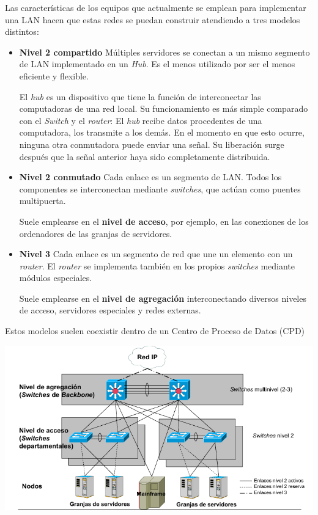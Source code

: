 Las características de los equipos que actualmente se emplean para implementar una LAN hacen que estas redes se puedan construir atendiendo a tres modelos distintos:
\begin{itemize}
\item \textbf{Nivel 2 compartido} Múltiples servidores se conectan a un mismo segmento de LAN implementado en un \textit{Hub}. Es el menos utilizado por ser el menos eficiente y flexible.

El \textit{hub} es un dispositivo que tiene la función de interconectar las computadoras de una red local. Su funcionamiento es más simple comparado con el \textit{Switch} y el \textit{router}:
El \textit{hub} recibe datos procedentes de una computadora, los transmite a los demás. En el momento en que esto ocurre, ninguna otra conmutadora puede enviar una señal. Su liberación surge después que la señal anterior haya sido completamente distribuida.


\item \textbf{Nivel 2 conmutado} Cada enlace es un segmento de LAN. Todos los componentes se interconectan mediante \textit{switches}, que actúan como puentes multipuerta.

Suele emplearse en el \textbf{nivel de acceso}, por ejemplo, en las conexiones de los ordenadores de las granjas de servidores.

\item \textbf{Nivel 3} Cada enlace es un segmento de red que une un elemento con un \textit{router}. El \textit{router} se implementa también en los propios \textit{switches} mediante módulos especiales.

Suele emplearse en el \textbf{nivel de agregación} interconectando diversos niveles de acceso, servidores especiales y redes externas.
\end{itemize}

Estos modelos suelen coexistir dentro de un Centro de Proceso de Datos (CPD)
\begin{center}
\includegraphics[width=\linewidth]{img/niveles.png}
\end{center}

